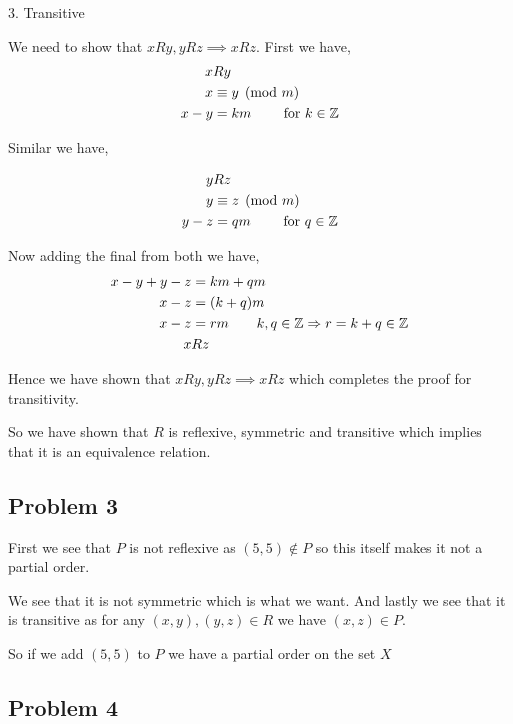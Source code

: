 \documentclass[a4paper]{report}
\begin{document}
3. Transitive

We need to show that  $xRy, yRz \implies xRz$. First we have, 
\begin{align*}
    x&Ry \\
    x &\equiv y \pmod m\\
    x - y &= km \qquad \text{ for $k \in \mathbb{Z}$}
\end{align*}

Similar we have, 

\begin{align*}
    y&Rz \\
    y &\equiv z \pmod m\\
    y - z &= qm \qquad \text{ for $q \in \mathbb{Z}$}
\end{align*}


Now adding the final from both we have, 
\begin{align*}
    x - y + y - z &= km + qm\\
    x - z &= (k + q)m\\
    x - z &= rm \qquad \text{$k,q \in \mathbb{Z} \Rightarrow r = k + q \in \mathbb{Z}$}\\
    x&Rz
\end{align*}

Hence we have shown that $xRy, yRz \implies xRz$ which completes the proof for transitivity.



So we have shown that $R$ is reflexive, symmetric and transitive which implies that it is an equivalence relation.

\subsection*{Problem 3}
First we see that $P$ is not reflexive as $(5,5) \not \in P$ so this itself makes it not a partial order. 

We see that it is not symmetric which is what we want. And lastly we see that it is transitive as for any $(x,y), (y,z) \in R$ we have  $(x,z) \in P$.

So if we add  $(5,5)$ to  $P$ we have a partial order on the set $X$
\subsection*{Problem 4}
\end{document}
